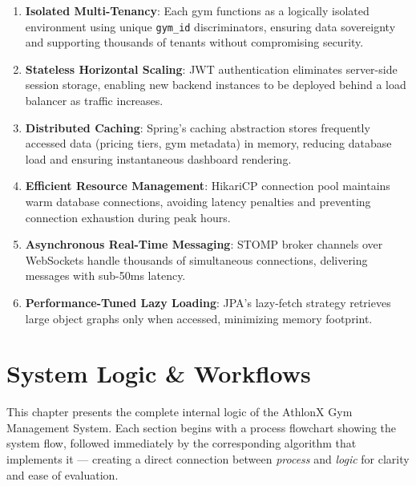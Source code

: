 \documentclass[
  12pt,
  a4paperpaper,
]{report}
\begin{document}
\begin{enumerate}
    \item \textbf{Isolated Multi-Tenancy}: Each gym functions as a logically isolated environment using unique \texttt{gym\_id} discriminators, ensuring data sovereignty and supporting thousands of tenants without compromising security.
    
    \item \textbf{Stateless Horizontal Scaling}: JWT authentication eliminates server-side session storage, enabling new backend instances to be deployed behind a load balancer as traffic increases.
    
    \item \textbf{Distributed Caching}: Spring's caching abstraction stores frequently accessed data (pricing tiers, gym metadata) in memory, reducing database load and ensuring instantaneous dashboard rendering.
    
    \item \textbf{Efficient Resource Management}: HikariCP connection pool maintains warm database connections, avoiding latency penalties and preventing connection exhaustion during peak hours.
    
    \item \textbf{Asynchronous Real-Time Messaging}: STOMP broker channels over WebSockets handle thousands of simultaneous connections, delivering messages with sub-50ms latency.
    
    \item \textbf{Performance-Tuned Lazy Loading}: JPA's lazy-fetch strategy retrieves large object graphs only when accessed, minimizing memory footprint.
\end{enumerate}





\chapter{System Logic \& Workflows}\label{system-logic-workflows}

\noindent
This chapter presents the complete internal logic of the AthlonX Gym Management System. Each section begins with a process flowchart showing the system flow, followed immediately by the corresponding algorithm that implements it --- creating a direct connection between \textit{process} and \textit{logic} for clarity and ease of evaluation.

\nopagebreak
\end{document}
